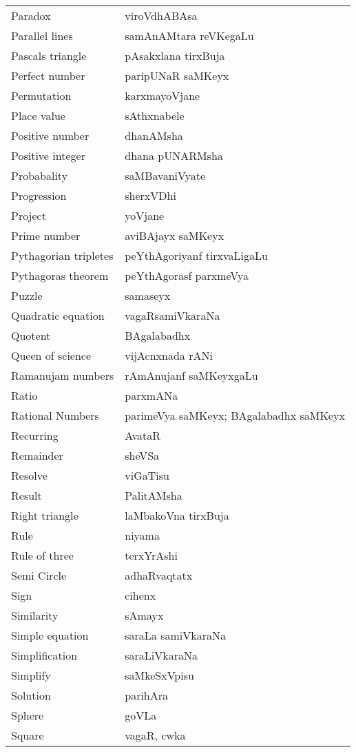 {\begin{longtable}{>{\rm}l@{\hspace{1cm}}l}
Paradox & viroVdhABAsa\\
Parallel lines & samAnAMtara reVKegaLu\\
Pascals triangle & pAsakxlana tirxBuja\\
Perfect number & paripUNaR saMKeyx\\
Permutation & karxmayoVjane\\
Place value & sAthxnabele\\
Positive number & dhanAMsha\\
Positive integer & dhana pUNARMsha\\
Probabality & saMBavaniVyate\\
Progression & sherxVDhi\\
Project & yoVjane\\
Prime number & aviBAjayx saMKeyx\\
Pythagorian tripletes & peYthAgoriyanf tirxvaLigaLu\\
Pythagoras theorem & peYthAgorasf parxmeVya\\
Puzzle & samaseyx\\
Quadratic equation & vagaRsamiVkaraNa\\
Quotent & BAgalabadhx\\
Queen of science & vijAcnxnada rANi\\
Ramanujam numbers & rAmAnujanf saMKeyxgaLu\\
Ratio & parxmANa\\
Rational Numbers & parimeVya saMKeyx; BAgalabadhx saMKeyx\\
Recurring & AvataR\\
Remainder & sheVSa\\
Resolve & viGaTisu\\
Result & PalitAMsha\\
Right triangle & laMbakoVna tirxBuja\\
Rule & niyama\\
Rule of three & terxYrAshi\\
Semi Circle & adhaRvaqtatx\\
Sign & cihenx\\
Similarity & sAmayx\\
Simple equation & saraLa samiVkaraNa\\
Simplification & saraLiVkaraNa\\
Simplify & saMkeSxVpisu\\
Solution & parihAra\\
Sphere & goVLa\\
Square & vagaR, cwka\\

\end{longtable}}
